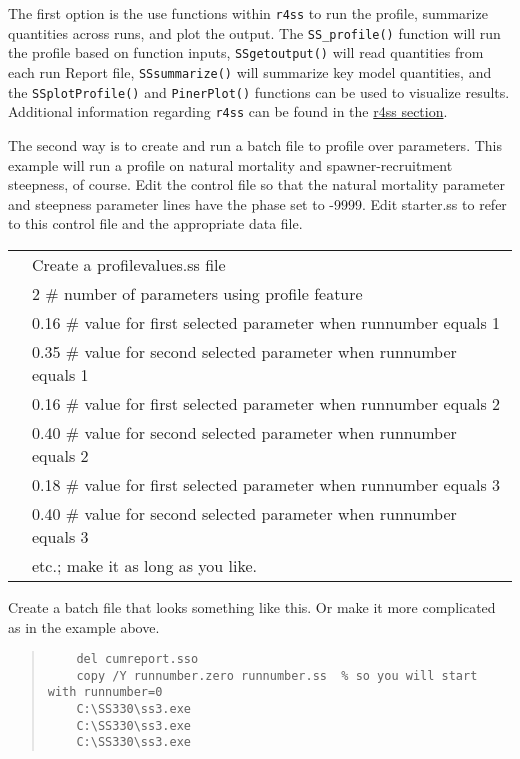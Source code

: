 The first option is the use functions within \texttt{r4ss} to run the profile, summarize quantities across runs, and plot the output. The \texttt{SS\_profile()} function will run the profile based on function inputs, \texttt{SSgetoutput()} will read quantities from each run Report file, \texttt{SSsummarize()} will summarize key model quantities, and the \texttt{SSplotProfile()} and \texttt{PinerPlot()} functions can be used to visualize results.  Additional information regarding \texttt{r4ss} can be found in the \hyperref[sec:r4ss]{r4ss section}. 

The second way is to create and run a batch file to profile over parameters. This example will run a profile on natural mortality and spawner-recruitment steepness, of course. Edit the control file so that the natural mortality parameter and steepness parameter lines have the phase set to -9999. Edit starter.ss to refer to this control file and the appropriate data file.

	\begin{longtable}{p{0.5cm} p{16cm}}		
		& Create a profilevalues.ss file \\
		& 2	\# number of parameters using profile feature \\
		& 0.16	\# value for first selected parameter when runnumber equals 1 \\
		& 0.35	\# value for second selected parameter when runnumber equals 1 \\
		& 0.16	\# value for first selected parameter when runnumber equals 2 \\
		& 0.40	\# value for second selected parameter when runnumber equals 2 \\
		& 0.18	\# value for first selected parameter when runnumber equals 3 \\
		& 0.40	\# value for second selected parameter when runnumber equals 3 \\
		& etc.;  make it as long as you like. \\
	\end{longtable}

Create a batch file that looks something like this. Or make it more complicated as in the example above.


\begin{quote}
\begin{verbatim}
	del cumreport.sso
	copy /Y runnumber.zero runnumber.ss  % so you will start with runnumber=0 
	C:\SS330\ss3.exe 
	C:\SS330\ss3.exe 
	C:\SS330\ss3.exe 
\end{verbatim}
\end{quote}


